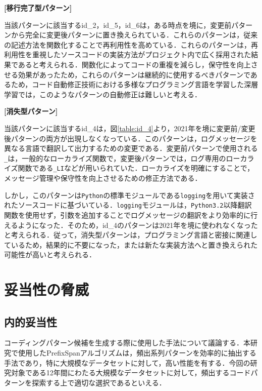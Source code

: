 \documentclass[11pt]{jreport}
\begin{document}
\noindent\textbf{[移行完了型パターン] }

当該パターンに該当するid\_2，id\_5，id\_6は，ある時点を境に，変更前パターンから完全に変更後パターンに置き換えられている．これらのパターンは，従来の記述方法を関数化することで再利用性を高めている．これらのパターンは，再利用性を重視したソースコードの実装方法がプロジェクト内で広く採用された結果であると考えられる．関数化によってコードの重複を減らし，保守性を向上させる効果があったため，これらのパターンは継続的に使用するべきパターンであるため，コード自動修正技術における多様なプログラミング言語を学習した深層学習では，このようなパターンの自動修正は難しいと考える．

\noindent\textbf{[消失型パターン] }

当該パターンに該当するid\_4は，図\ref{table:id_4}より，2021年を境に変更前/変更後パターンの両方が出現しなくなっている．このパターンは，ログメッセージを異なる言語で翻訳して出力するための変更である．変更前パターンで使用される\texttt{\_}は，一般的なローカライズ関数で，変更後パターンでは，ログ専用のローカライズ関数である\texttt{\_LI}などが用いられていた．ローカライズを明確にすることで，メッセージ管理や保守性を向上させるための修正方法である．

しかし，このパターンは\texttt{Python}の標準モジュールである\texttt{logging}を用いて実装されたソースコードに基づいている．\texttt{logging}モジュールは，\texttt{Python3.2}以降翻訳関数を使用せず，引数を追加することでログメッセージの翻訳をより効率的に行えるようになった．そのため，id\_4のパターンは2021年を境に使われなくなったと考えられる．従って，消失型パターンは，プログラミング言語と密接に関連しているため，結果的に不要になった，または新たな実装方法へと置き換えられた可能性が高いと考えられる．

\chapter{妥当性の脅威}
\section{内的妥当性}
コーディングパターン候補を生成する際に使用した手法について議論する．本研究で使用したPrefixSpanアルゴリズムは，頻出系列パターンを効率的に抽出する手法であり，特に大規模なデータセットに対して，高い性能を有する．今回の研究対象である12年間にわたる大規模なデータセットに対して，頻出するコードパターンを探索する上で適切な選択であるといえる．
\end{document}
